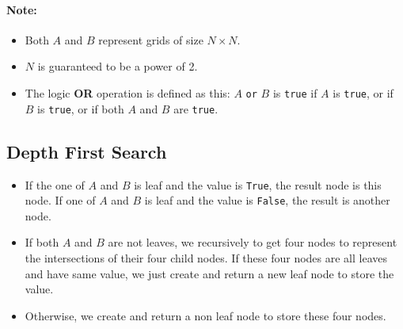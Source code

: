 \begin{figure}[H]
\begin{minipage}{0.3\linewidth}
\centering
{}
\end{minipage}
\hfill
\begin{minipage}{0.3\linewidth}
\centering
{}
\end{minipage}
\hfill
\begin{minipage}{0.3\linewidth}
\centering
{}
\end{minipage}
\end{figure}

\paragraph{Note:}

\begin{itemize}
\item Both $A$ and $B$ represent grids of size $N \times N$.
\item $N$ is guaranteed to be a power of 2.
\item The logic \textbf{OR} operation is defined as this: $A$ \texttt{or} $B$ is \texttt{true} if $A$ is \texttt{true}, or if $B$ is \texttt{true}, or if both $A$ and $B$ are \texttt{true}.
\end{itemize}

\subsection{Depth First Search}
\begin{itemize}
\item If the one of $A$ and $B$ is leaf and the value is \texttt{True}, the result node is this node. If one of $A$ and $B$ is leaf and the value is \texttt{False}, the result is another node.
\item If both $A$ and $B$ are not leaves, we recursively to get four nodes to represent the intersections of their four child nodes. If these four nodes are all leaves and have same value, we just create and return a new leaf node to store the value.
\item Otherwise, we create and return a non leaf node to store these four nodes.
\end{itemize}

